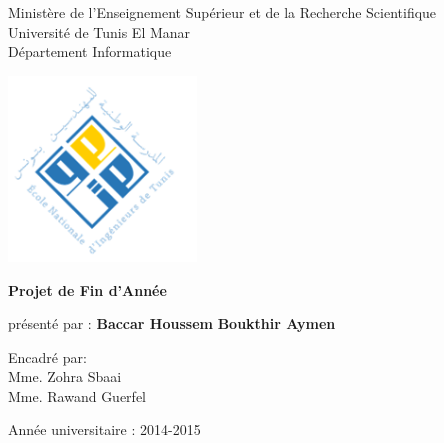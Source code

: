 \begin{center}
Ministère de l'Enseignement Supérieur et de la Recherche Scientifique\\
Université de Tunis El Manar \\
Département Informatique \vskip 0.4cm

			\includegraphics[width=5cm]{en}

\Large{\textbf{Projet de Fin d'Année}}

 \vskip -1mm
 présenté par :
 \vskip -0.4mm
 \Large \textbf{Baccar Houssem}
 \vskip -1mm
 \Large \textbf{Boukthir Aymen}
 \vskip 4mm

\vskip 1cm


\vskip 1cm

\vskip 1cm
Encadré par:\\
Mme. Zohra Sbaai \\
Mme. Rawand Guerfel\\
\end{center}

%
%

\vskip 1cm
\centerline {Année universitaire : 2014-2015}

